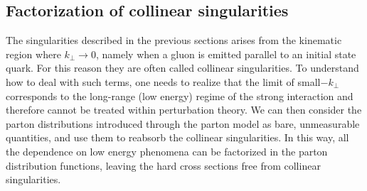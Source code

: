 \subsection{Factorization of collinear singularities}
The singularities described in the previous sections arises from the kinematic region where $k_{\perp}\rightarrow 0$,
namely when a gluon is emitted parallel to an initial state quark. For this reason they are often called collinear
singularities.
To understand how to deal with such terms, one needs to realize that the limit of small$-k_{\perp}$
corresponds to the long-range (low energy) regime of the strong interaction and therefore cannot be treated
within perturbation theory.
We can then consider the parton distributions introduced through the parton model as bare, unmeasurable
quantities, and use them to reabsorb the collinear singularities. In this way, all the dependence on
low energy phenomena can be factorized in the parton distribution functions, leaving the hard
cross sections free from collinear singularities.

